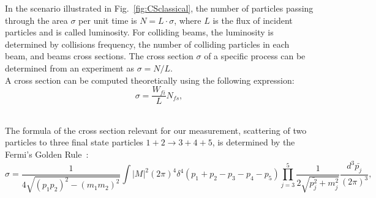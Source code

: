 In the scenario illustrated in Fig.~\ref{fig:CSclassical}, the number of particles passing through the area $\sigma$ per unit time is $N=L \cdot \sigma$, where $L$ is the flux of incident particles and is called luminosity. For colliding beams, the luminosity is determined by collisions frequency, the number of colliding particles in each beam, and beams cross sections. The cross section $\sigma$ of a specific process can be determined from an experiment as $\sigma=N/L$. \\

A cross section can be computed theoretically using the following expression:\\

\begin{equation}
  \sigma = \frac{W_{fi}}{L} N_{fs},
\end{equation}

\\ 

The formula of the cross section relevant for our measurement, scattering of two particles to three final state particles $1+2\rightarrow 3+4+5$, is determined by the Fermi's Golden Rule~\cite{ref_Griffiths}: \\

\begin{equation}\label{eq:FermiGoldenRule}
  \sigma = \frac{ 1 }{4\sqrt{(p_1p_2)^2-(m_1m_2)^2}} \int |M|^2 (2\pi)^4 \delta^4(p_1+p_2-p_3-p_4-p_5) \prod_{j=3}^{5} \frac{1}{2 \sqrt{\bar{p_j^2}+m_j^2 }}\frac{d^3\bar{p_j}}{(2\pi)^3},  
\end{equation}

\\ 

